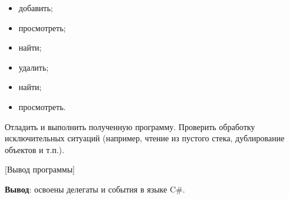 \documentclass{bsuir}
\newcommand{\csharp}{C{\liberationrm\#}}
\begin{document}
    \begin{itemize}
        \item добавить;
        \item просмотреть;
        \item найти;
        \item удалить;
        \item найти;
        \item просмотреть.
    \end{itemize}

    Отладить и выполнить полученную программу. Проверить обработку
    исключительных ситуаций (например, чтение из пустого стека, дублирование
    объектов и т.п.).


    [Вывод программы]

    \textbf{Вывод}: освоены делегаты и события в языке \csharp.
\end{document}
